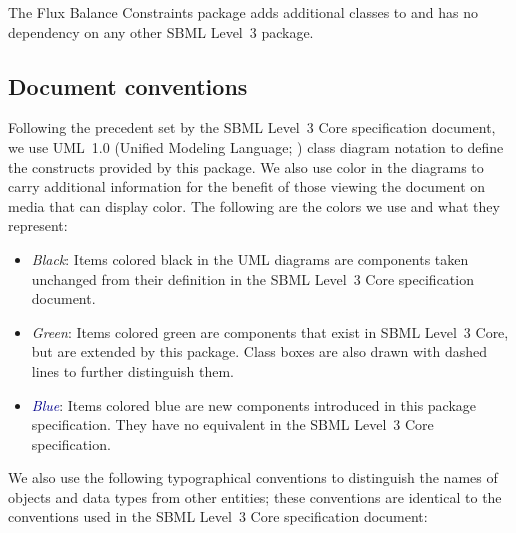 The Flux Balance Constraints package adds additional classes to \sbmlthreecore and has no dependency on any other SBML Level~3 package.


\subsection{Document conventions}
\label{conventions}

Following the precedent set by the SBML Level~3 Core specification
document, we use UML~1.0 (Unified Modeling Language;
\citealt{eriksson:1998,oestereich:1999}) class diagram notation to
define the constructs provided by this package.  We also use color in
the diagrams to carry additional information for the benefit of those
viewing the document on media that can display color.  The following are
the colors we use and what they represent:

\begin{itemize}

\item[\raisebox{2.75pt}{\colorbox{black}{\rule{0.8pt}{0.8pt}}}]
  \emph{Black}: Items colored black in the UML diagrams are components
  taken unchanged from their definition in the SBML Level~3 Core
  specification document.

\item[\raisebox{2.75pt}{\colorbox{mediumgreen}{\rule{0.8pt}{0.8pt}}}]
  \emph{\textcolor{mediumgreen}{Green}}: Items colored green are
  components that exist in SBML Level~3 Core, but are extended by this
  package.  Class boxes are also drawn with dashed lines to further
  distinguish them.

\item[\raisebox{2.75pt}{\colorbox{darkblue}{\rule{0.8pt}{0.8pt}}}]
  \emph{\textcolor{darkblue}{Blue}}: Items colored blue are new
  components introduced in this package specification.  They have no
  equivalent in the SBML Level~3 Core specification.

\end{itemize}

We also use the following typographical conventions to distinguish the
names of objects and data types from other entities; these conventions
are identical to the conventions used in the SBML Level~3 Core specification
document:

